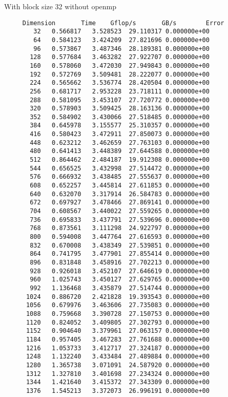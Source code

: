 \documentclass{article}
\begin{document}
With block size 32
without openmp
\begin{verbatim}
     Dimension       Time    Gflop/s       GB/s        Error
        32   0.566817   3.528523  29.110317 0.000000e+00
        64   0.584123   3.424209  27.821696 0.000000e+00
        96   0.573867   3.487346  28.189381 0.000000e+00
       128   0.577684   3.463282  27.922707 0.000000e+00
       160   0.578060   3.472030  27.949843 0.000000e+00
       192   0.572769   3.509481  28.222077 0.000000e+00
       224   0.565662   3.536774  28.420504 0.000000e+00
       256   0.681717   2.953228  23.718111 0.000000e+00
       288   0.581095   3.453107  27.720772 0.000000e+00
       320   0.578903   3.509425  28.163136 0.000000e+00
       352   0.584902   3.430066  27.518485 0.000000e+00
       384   0.645978   3.155577  25.310357 0.000000e+00
       416   0.580423   3.472911  27.850073 0.000000e+00
       448   0.623212   3.462659  27.763103 0.000000e+00
       480   0.641413   3.448389  27.644588 0.000000e+00
       512   0.864462   2.484187  19.912308 0.000000e+00
       544   0.656525   3.432998  27.514472 0.000000e+00
       576   0.666932   3.438485  27.555637 0.000000e+00
       608   0.652257   3.445814  27.611853 0.000000e+00
       640   0.632070   3.317914  26.584783 0.000000e+00
       672   0.697927   3.478466  27.869141 0.000000e+00
       704   0.608567   3.440022  27.559265 0.000000e+00
       736   0.695833   3.437791  27.539696 0.000000e+00
       768   0.873561   3.111298  24.922797 0.000000e+00
       800   0.594008   3.447764  27.616593 0.000000e+00
       832   0.670008   3.438349  27.539851 0.000000e+00
       864   0.741795   3.477901  27.855414 0.000000e+00
       896   0.831848   3.458916  27.702213 0.000000e+00
       928   0.926018   3.452107  27.646619 0.000000e+00
       960   1.025743   3.450127  27.629765 0.000000e+00
       992   1.136468   3.435879  27.514744 0.000000e+00
      1024   0.886720   2.421828  19.393543 0.000000e+00
      1056   0.679976   3.463606  27.735083 0.000000e+00
      1088   0.759668   3.390728  27.150753 0.000000e+00
      1120   0.824052   3.409805  27.302793 0.000000e+00
      1152   0.904640   3.379961  27.063157 0.000000e+00
      1184   0.957405   3.467283  27.761688 0.000000e+00
      1216   1.053733   3.412717  27.324187 0.000000e+00
      1248   1.132240   3.433484  27.489884 0.000000e+00
      1280   1.365738   3.071091  24.587920 0.000000e+00
      1312   1.327810   3.401698  27.234324 0.000000e+00
      1344   1.421640   3.415372  27.343309 0.000000e+00
      1376   1.545213   3.372073  26.996191 0.000000e+00

\end{verbatim}
\end{document}
